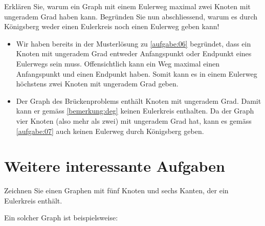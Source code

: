\begin{myexercise}\label{aufgabe:07}
Erklären Sie, warum ein Graph mit einem Eulerweg maximal zwei Knoten mit ungeradem Grad haben kann. Begründen Sie nun abschliessend, warum es durch Königsberg weder einen Eulerkreis noch einen Eulerweg geben kann!
\begin{myanswer}\label{aufgabe:07-sol}
\begin{itemize}
    \item Wir haben bereits in der Musterlösung zu \cref{aufgabe:06} begründet, dass ein Knoten mit ungeradem Grad entweder Anfangspunkt oder Endpunkt eines Eulerwegs sein muss. Offensichtlich kann ein Weg maximal einen Anfangspunkt und einen Endpunkt haben. Somit kann es in einem Eulerweg höchstens zwei Knoten mit ungeradem Grad geben.
    \item Der Graph des Brückenproblems enthält Knoten mit ungeradem Grad. Damit kann er gemäss \cref{bemerkung:deg} keinen Eulerkreis enthalten. Da der Graph vier Knoten (also mehr als zwei) mit ungeradem Grad hat, kann es gemäss \cref{aufgabe:07} auch keinen Eulerweg durch Königsberg geben.
\end{itemize}
\end{myanswer}
\end{myexercise}

\clearpage
\section{Weitere interessante Aufgaben}
\begin{myexercise}\label{aufgabe:08}
Zeichnen Sie einen Graphen mit fünf Knoten und sechs Kanten, der ein Eulerkreis enthält.
\begin{myanswer}\label{aufgabe:08-sol}
Ein solcher Graph ist beispielsweise:
\begin{figure}[H]
     \centering
{}%
\end{figure}
\end{myanswer}
\end{myexercise}

